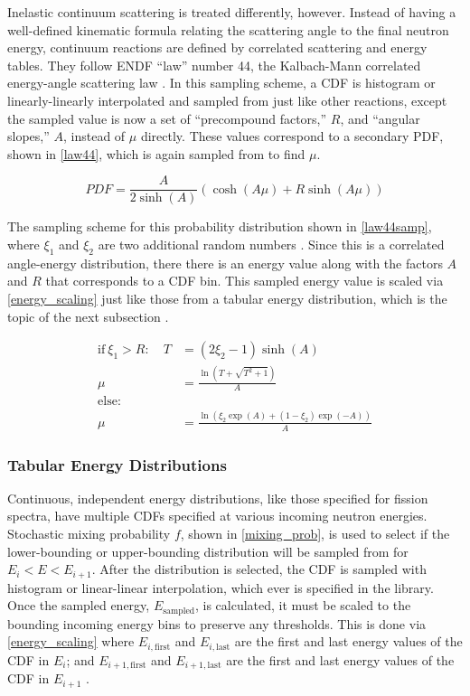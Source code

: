 Inelastic continuum scattering is treated differently, however.  Instead of having a well-defined kinematic formula relating the scattering angle to the final neutron energy, continuum reactions are defined by correlated scattering and energy tables.  They follow ENDF ``law'' number 44, the Kalbach-Mann correlated energy-angle scattering law \cite{mcnp} \cite{openmc}.  In this sampling scheme, a CDF is histogram or linearly-linearly interpolated and sampled from just like other reactions, except the sampled value is now a set of ``precompound factors,'' $R$, and ``angular slopes,'' $A$, instead of $\mu$ directly.  These values correspond to a secondary PDF, shown in \eqref{law44}, which is again sampled from to find $\mu$.

\begin{equation}
\label{law44}
PDF = \frac{A}{2 \sinh (A)} ( \cosh(A\mu)+R \sinh (A\mu))
\end{equation}

The sampling scheme for this probability distribution shown in \eqref{law44samp}, where $\xi_1$ and $\xi_2$ are two additional random numbers .  Since this is a correlated angle-energy distribution, there there is an energy value along with the factors $A$ and $R$ that corresponds to a CDF bin.  This sampled energy value is scaled via \eqref{energy_scaling} just like those from a tabular energy distribution, which is the topic of the next subsection \cite{3rdsampler}\cite{openmc}.

\begin{equation}
\label{law44samp}
\begin{split}
\mathrm{if} \: \xi_1 > R:  \quad T&=(2\xi_2-1)\sinh(A)\\
\mu &= \frac{\ln(T+\sqrt{T^2+1})}{A}\\
\mathrm{else: }  \qquad & \\
\mu &= \frac{ \ln(\xi_2 \exp(A) + (1-\xi_2)\exp(-A))}{A}
\end{split}
\end{equation}

\subsubsection{Tabular Energy Distributions}

Continuous, independent energy distributions, like those specified for fission spectra, have multiple CDFs specified at various incoming neutron energies.  Stochastic mixing probability $f$, shown in \eqref{mixing_prob}, is used to select if the lower-bounding or upper-bounding distribution will be sampled from for $E_i < E < E_{i+1}$.  After the distribution is selected, the CDF is sampled with histogram or linear-linear interpolation, which ever is specified in the library.  Once the sampled energy, $E_\mathrm{sampled}$, is calculated, it must be scaled to the bounding incoming energy bins to preserve any thresholds.  This is done via \eqref{energy_scaling} where $E_{i,\mathrm{first}}$ and $E_{i,\mathrm{last}}$ are the first and last energy values of the CDF in $E_i$; and $E_{i+1,\mathrm{first}}$ and $E_{i+1,\mathrm{last}}$ are the first and last energy values of the CDF in $E_{i+1}$ \cite{mcnp}.


